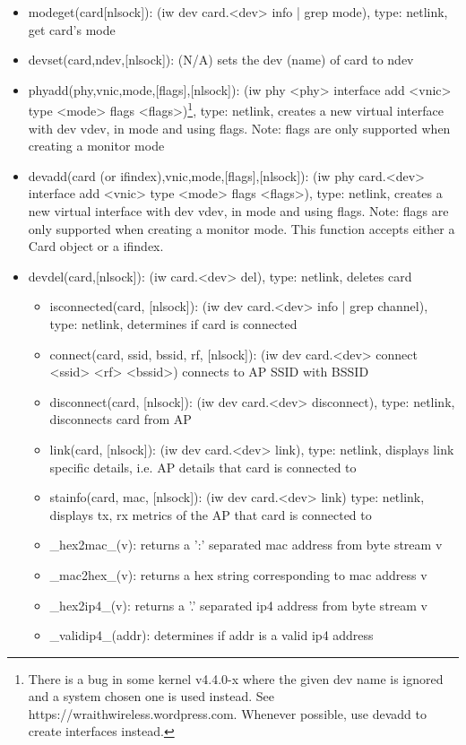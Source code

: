 \documentclass[11pt]{article}
\begin{document}
\begin{appendices}
\begin{itemize}
[flags]), type: netlink, set card's mode to mode with flags (if mode is monitor)
\item modeget(card[nlsock]): (iw dev card.<dev> info | grep mode), type: netlink,
get card's mode
\item devset(card,ndev,[nlsock]): (N/A) sets the dev (name) of card to ndev 
\item phyadd(phy,vnic,mode,[flags],[nlsock]): (iw phy <phy> interface add <vnic>
type <mode> flags <flags>)\footnote{There is a bug in some kernel v4.4.0-x 
where the given dev name is ignored and a system chosen one is used instead. See 
https://wraithwireless.wordpress.com. Whenever possible, use devadd to create 
interfaces instead.}, type: netlink, creates a new virtual interface with dev vdev, 
in mode and using flags. Note: flags are only supported when creating a monitor mode
\item devadd(card (or ifindex),vnic,mode,[flags],[nlsock]): (iw phy card.<dev> 
interface add <vnic> type <mode> flags <flags>), type: netlink, creates a new virtual 
interface with dev vdev, in mode and using flags. Note: flags are only supported
when creating a monitor mode. This function accepts either a Card object or a 
ifindex.
\item devdel(card,[nlsock]): (iw card.<dev> del), type: netlink, deletes card
\begin{itemize}
\item isconnected(card, [nlsock]): (iw dev card.<dev> info | grep channel), type: 
netlink, determines if card is connected
\item connect(card, ssid, bssid, rf, [nlsock]): (iw dev card.<dev> connect <ssid>
<rf> <bssid>) connects to AP SSID with BSSID
\item disconnect(card, [nlsock]): (iw dev card.<dev> disconnect), type: netlink,
disconnects card from AP 
\item link(card, [nlsock]): (iw dev card.<dev> link), type: netlink, displays
link specific details, i.e. AP details that card is connected to
\item stainfo(card, mac, [nlsock]): (iw dev card.<dev> link) type: netlink, displays
tx, rx metrics of the AP that card is connected to
\item \_hex2mac\_(v): returns a ':' separated mac address from byte stream v
\item \_mac2hex\_(v): returns a hex string corresponding to mac address v
\item \_hex2ip4\_(v): returns a '.' separated ip4 address from byte stream v
\item \_validip4\_(addr): determines if addr is a valid ip4 address

\end{itemize}
\end{itemize}
\end{appendices}
\end{document}

